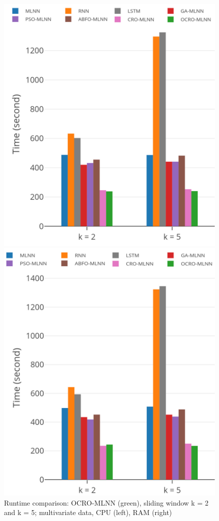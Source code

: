 \documentclass[review,3p,authoryear]{elsarticle}
\begin{document}
{\begin{figure}
	\centering
	\begin{minipage}[t]{8cm}
		\centering
		\includegraphics[width=0.8\textwidth =0cm 0cm 0cm 0cm]{images/pdf/time/time_cpu.pdf}
	\end{minipage}
	\begin{minipage}[t]{8cm}
		\centering
		\includegraphics[width=0.8\textwidth =0cm 0cm 0cm 0cm]{images/pdf/time/time_ram.pdf}
	\end{minipage}
	\caption{Runtime comparison: OCRO-MLNN (green), sliding window k = 2 and k = 5; multivariate data, CPU (left), RAM (right)} 
	\label{fig:speed_system_multivariate}
\end{figure}




}
\end{document}
